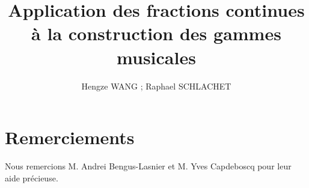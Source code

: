 \documentclass[moyen]{classeUPD}
\begin{document}
\frontmatter
{} %
\title{Application des fractions continues \`a la construction des gammes musicales} 
\author{Hengze WANG ; Raphael SCHLACHET}
\university %
\ed[L1 MIASHS] %

\makecover %
\maketitle

\backmatter
\chapter{Remerciements}

Nous remercions M. Andrei Bengus-Lasnier et M. Yves Capdeboscq pour leur aide pr\'ecieuse.

\clearpage

\tableofcontents
\clearpage

\end{document}
